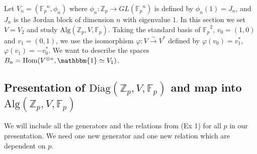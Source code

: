 \documentclass[11pt]{article} %
\begin{document}
Let $V_n=({\mathbb{F}_p}^n,\phi_n)$ where $\phi_n: \mathbb{Z}_p \rightarrow GL({\mathbb{F}_p}^n)$ is defined by $\phi_n(1)=J_n$, and $J_n$ is the Jordan block of dimension $n$ with eigenvalue $1$. In this section we set $V=V_2$ and study $\text{Alg}({\mathbb{Z}_p,V, \mathbb{F}_p})$. Taking the standard basis of ${\mathbb{F}_p}^2$, $v_0 = (1,0)$ and  $v_1 = (0,1)$, we use the isomorphism $\varphi:V \xrightarrow{\sim} V^{\ast}$ defined by $\varphi(v_0)=v_1^{\ast}$, $\varphi(v_1)=-v_0^{\ast}$. We want to describe the spaces $B_n = \text{Hom}(V^{\otimes n},\mathbbm{1} \simeq V_1)$.

\subsection {Presentation of $\text{Diag}{(\mathbb{Z}_p,V,\mathbb{F}_p)}$ and map into $\text{Alg}{(\mathbb{Z}_p,V,\mathbb{F}_p)}$}

We will include all the generators and the relations from (Ex 1) for all $p$ in our presentation. We need one new generator and one new relation which are dependent on $p$.
\end{document}

